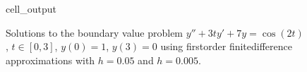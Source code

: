 \documentclass[letterpaper,10pt,english]{jupyterBook}
\begin{document}
\begin{figure}[htbp]
\centering
\capstart
\begin{sphinxVerbatimOutput}

\begin{sphinxuseclass}{cell_output}
\noindent{}

\end{sphinxuseclass}\end{sphinxVerbatimOutput}
\caption{Solutions to the boundary value problem \(y'' + 3ty' + 7y = \cos (2t)\), \(t \in [0,3]\), \(y(0) = 1\), \(y(3) = 0\) using first\sphinxhyphen{}order finite\sphinxhyphen{}difference approximations with \(h=0.05\) and \(h=0.005\).}\label{\detokenize{5_BVPs/5.2_Finite_difference_method:bvp-fdm-accuracy-figure-1}}\end{figure}
\end{document}
